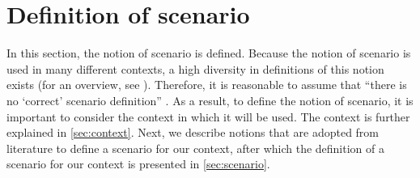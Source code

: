 \cbstart
\section{Definition of scenario}
\label{sec:definition scenario}

In this section, the notion of scenario is defined. Because the notion of scenario is used in many different contexts, a high diversity in definitions of this notion exists (for an overview, see \cite{vannotten2003updated, bishop2007scentechniques}). Therefore, it is reasonable to assume that ``there is no `correct' scenario definition'' \cite{vannotten2003updated}. As a result, to define the notion of scenario, it is important to consider the context in which it will be used. The context is further explained in \cref{sec:context}. Next, we describe notions that are adopted from literature to define a scenario for our context, after which the definition of a scenario for our context is presented in \cref{sec:scenario}.
\cbend


